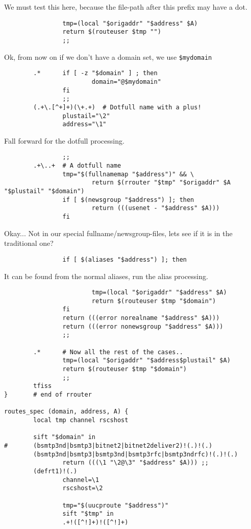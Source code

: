 We must test this here, because the file-path after
this prefix may have a dot.

\begin{verbatim}
                tmp=(local "$origaddr" "$address" $A)
                return $(routeuser $tmp "")
                ;;
\end{verbatim}


Ok, from now on if we don't have a domain set, we use {\tt \$mydomain}

\begin{verbatim}
        .*      if [ -z "$domain" ] ; then
                        domain="@$mydomain"
                fi
                ;;
        (.+\.[^+]+)(\+.+)  # Dotfull name with a plus!
                plustail="\2"
                address="\1"
\end{verbatim}


Fall forward for the dotfull processing.

\begin{verbatim}
                ;;
        .+\..+  # A dotfull name
                tmp="$(fullnamemap "$address")" && \
                        return $(rrouter "$tmp" "$origaddr" $A "$plustail" "$domain")
                if [ $(newsgroup "$address") ]; then
                        return (((usenet - "$address" $A)))
                fi
\end{verbatim}


Okay... Not in our special fullname/newsgroup-files,
lets see if it is in the traditional one?

\begin{verbatim}
                if [ $(aliases "$address") ]; then
\end{verbatim}


It can be found from the normal aliases,
run the alias processing.

\begin{verbatim}
                        tmp=(local "$origaddr" "$address" $A)
                        return $(routeuser $tmp "$domain")
                fi
                return (((error norealname "$address" $A)))
                return (((error nonewsgroup "$address" $A)))
                ;;

        .*      # Now all the rest of the cases..
                tmp=(local "$origaddr" "$address$plustail" $A)
                return $(routeuser $tmp "$domain")
                ;;
        tfiss
}       # end of rrouter

routes_spec (domain, address, A) {
        local tmp channel rscshost

        sift "$domain" in
#       (bsmtp3nd|bsmtp3|bitnet2|bitnet2deliver2)!(.)!(.)
        (bsmtp3nd|bsmtp3|bsmtp3nd|bsmtp3rfc|bsmtp3ndrfc)!(.)!(.)
                return (((\1 "\2@\3" "$address" $A))) ;;
        (defrt1)!(.)
                channel=\1
                rscshost=\2

                tmp="$(uucproute "$address")"
                sift "$tmp" in
                .+!([^!]+)!([^!]+)
\end{verbatim}


